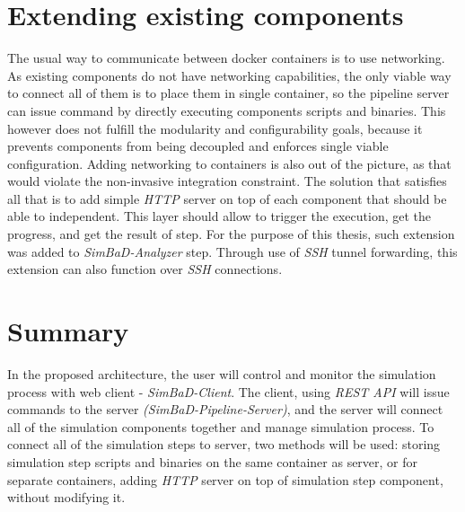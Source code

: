 \section{Extending existing components}
The usual way to communicate between docker containers is to use networking. As existing components do not have networking capabilities, the only viable way to connect all of them is to place them in single container, so the pipeline server can issue command by directly executing components scripts and binaries. This however does not fulfill the modularity and configurability goals, because it prevents components from being decoupled and enforces single viable configuration. Adding networking to containers is also out of the picture, as that would violate the non-invasive integration constraint. The solution that satisfies all that is to add simple \textit{HTTP} server on top of each component that should be able to independent. This layer should allow to trigger the execution, get the progress, and get the result of step. For the purpose of this thesis, such extension was added to \textit{SimBaD-Analyzer} step. Through use of \textit{SSH} tunnel forwarding, this extension can also function over \textit{SSH} connections.
\section{Summary}
In the proposed architecture, the user will control and monitor the simulation process with web client - \textit{SimBaD-Client}. The client, using \textit{REST API} will issue commands to the server \textit{(SimBaD-Pipeline-Server)}, and the server will connect all of the simulation components together and manage simulation process. To connect all of the simulation steps to server, two methods will be used: storing simulation step scripts and binaries on the same container as server, or for separate containers, adding \textit{HTTP} server on top of simulation step component, without modifying it.
